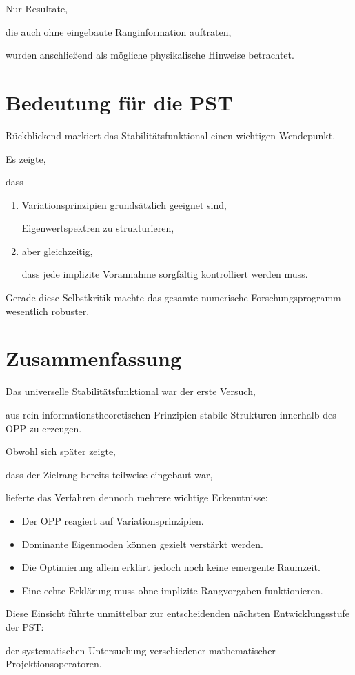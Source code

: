 Nur Resultate,

die auch ohne eingebaute Ranginformation auftraten,

wurden anschließend als mögliche physikalische Hinweise betrachtet.


\section*{Bedeutung für die PST}

Rückblickend markiert das Stabilitätsfunktional einen wichtigen Wendepunkt.

Es zeigte,

dass

\begin{enumerate}

\item Variationsprinzipien grundsätzlich geeignet sind,

Eigenwertspektren zu strukturieren,

\item aber gleichzeitig,

dass jede implizite Vorannahme sorgfältig kontrolliert werden muss.

\end{enumerate}

Gerade diese Selbstkritik machte das gesamte numerische Forschungsprogramm wesentlich robuster.


\section*{Zusammenfassung}

Das universelle Stabilitätsfunktional war der erste Versuch,

aus rein informationstheoretischen Prinzipien stabile Strukturen innerhalb des OPP zu erzeugen.

Obwohl sich später zeigte,

dass der Zielrang bereits teilweise eingebaut war,

lieferte das Verfahren dennoch mehrere wichtige Erkenntnisse:

\begin{itemize}

\item Der OPP reagiert auf Variationsprinzipien.

\item Dominante Eigenmoden können gezielt verstärkt werden.

\item Die Optimierung allein erklärt jedoch noch keine emergente Raumzeit.

\item Eine echte Erklärung muss ohne implizite Rangvorgaben funktionieren.

\end{itemize}

Diese Einsicht führte unmittelbar zur entscheidenden nächsten Entwicklungsstufe der PST:

der systematischen Untersuchung verschiedener mathematischer Projektionsoperatoren.

